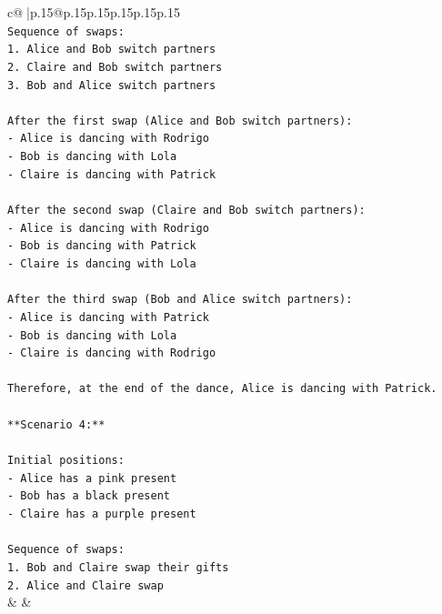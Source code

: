 \documentclass{article}
\begin{document}
{\begin{supertabular}{c@{$\;$}|p{.15\linewidth}@{}p{.15\linewidth}p{.15\linewidth}p{.15\linewidth}p{.15\linewidth}p{.15\linewidth}}
{{{\\ 
\texttt{Sequence of swaps:} \\
\texttt{1. Alice and Bob switch partners} \\
\texttt{2. Claire and Bob switch partners} \\
\texttt{3. Bob and Alice switch partners} \\
\\ 
\texttt{After the first swap (Alice and Bob switch partners):} \\
\texttt{{-} Alice is dancing with Rodrigo} \\
\texttt{{-} Bob is dancing with Lola} \\
\texttt{{-} Claire is dancing with Patrick} \\
\\ 
\texttt{After the second swap (Claire and Bob switch partners):} \\
\texttt{{-} Alice is dancing with Rodrigo} \\
\texttt{{-} Bob is dancing with Patrick} \\
\texttt{{-} Claire is dancing with Lola} \\
\\ 
\texttt{After the third swap (Bob and Alice switch partners):} \\
\texttt{{-} Alice is dancing with Patrick} \\
\texttt{{-} Bob is dancing with Lola} \\
\texttt{{-} Claire is dancing with Rodrigo} \\
\\ 
\texttt{Therefore, at the end of the dance, Alice is dancing with Patrick.} \\
\\ 
\texttt{**Scenario 4:**} \\
\\ 
\texttt{Initial positions:} \\
\texttt{{-} Alice has a pink present} \\
\texttt{{-} Bob has a black present} \\
\texttt{{-} Claire has a purple present} \\
\\ 
\texttt{Sequence of swaps:} \\
\texttt{1. Bob and Claire swap their gifts} \\
\texttt{2. Alice and Claire swap} \\
            }
        }
    }
    & & \\ \\


\end{supertabular}}
\end{document}
